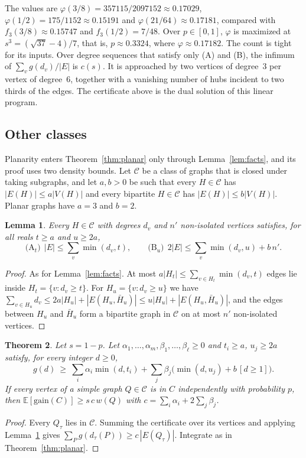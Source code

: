 \documentclass[11pt]{article}
\newtheorem{theorem}{Theorem}
\newtheorem{lemma}[theorem]{Lemma}
\theoremstyle{remark}
\newcommand{\E}{\mathbb{E}}
\begin{document}
The values are $\varphi(3/8)=357115/2097152\approx0.17029$, $\varphi(1/2)=175/1152\approx0.15191$
and $\varphi(21/64)\approx0.17181$, compared with $f_3(3/8)\approx0.15747$ and $f_3(1/2)=7/48$.
Over $p\in[0,1]$, $\varphi$ is maximized at $s^3=(\sqrt{37}-4)/7$, that is, $p\approx0.3324$, where
$\varphi\approx0.17182$. The count is tight for its inputs. Over degree sequences that satisfy only (A) and (B), the infimum
of $\sum_vg(d_v)/|E|$ is $c(s)$. It is approached by two vertices of degree~$3$ per vertex of
degree~$6$, together with a vanishing number of hubs incident to two thirds of the edges. The
certificate above is the dual solution of this linear program.

\subsection{Other classes}\label{sec:classes}

Planarity enters Theorem~\ref{thm:planar} only through Lemma~\ref{lem:facts}, and its proof uses
two density bounds. Let $\mathcal C$ be a class of graphs that is closed under taking subgraphs,
and let $a,b>0$ be such that every $H\in\mathcal C$ has $|E(H)|\le a|V(H)|$ and every bipartite
$H\in\mathcal C$ has $|E(H)|\le b|V(H)|$. Planar graphs have $a=3$ and $b=2$.

\begin{lemma}\label{lem:factsgen}
Every $H\in\mathcal C$ with degrees $d_v$ and $n'$ non-isolated vertices satisfies, for all reals
$t\ge a$ and $u\ge 2a$,
\[
  \text{(A$_t$)}\ \ |E|\le\sum_v\min(d_v,t),\qquad
  \text{(B$_u$)}\ \ 2|E|\le\sum_v\min(d_v,u)+b\,n'.
\]
\end{lemma}
\begin{proof}
As for Lemma~\ref{lem:facts}. At most $a|H_t|\le\sum_{v\in H_t}\min(d_v,t)$ edges lie inside
$H_t=\{v:d_v\ge t\}$. For $H_u=\{v:d_v\ge u\}$ we have
$\sum_{v\in H_u}d_v\le 2a|H_u|+|E(H_u,\bar H_u)|\le u|H_u|+|E(H_u,\bar H_u)|$, and the edges between
$H_u$ and $\bar H_u$ form a bipartite graph in $\mathcal C$ on at most $n'$ non-isolated vertices.
\end{proof}

\begin{theorem}\label{thm:general}
Let $s=1-p$. Let $\alpha_1,\dots,\alpha_m,\beta_1,\dots,\beta_\ell\ge0$ and $t_i\ge a$,
$u_j\ge2a$ satisfy, for every integer $d\ge0$,
\[
  g(d)\ \ge\ \sum_i\alpha_i\min(d,t_i)+\sum_j\beta_j\big(\min(d,u_j)+b\,[d\ge1]\big).
\]
If every vertex of a simple graph $Q\in\mathcal C$ is in $C$ independently with probability $p$,
then $\E[\mathrm{gain}(C)]\ge s\,c\,w(Q)$ with $c=\sum_i\alpha_i+2\sum_j\beta_j$.
\end{theorem}
\begin{proof}
Every $Q_\tau$ lies in $\mathcal C$. Summing the certificate over its vertices and applying
Lemma~\ref{lem:factsgen} gives $\sum_Pg(d_\tau(P))\ge c\,|E(Q_\tau)|$. Integrate as in
Theorem~\ref{thm:planar}.
\end{proof}
\end{document}

